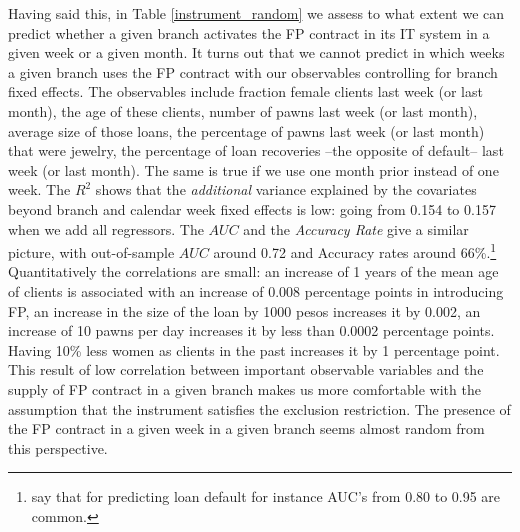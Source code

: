 \documentclass[oneside,11pt]{article}
\begin{document}
Having said this, in Table \ref{instrument_random} we assess to what extent we can predict whether a given branch activates the FP contract in its IT system in a given week or a given month. It turns out that we cannot predict in which weeks a given branch uses the FP contract with our observables controlling for branch fixed effects. The observables include fraction female clients last week (or last month), the age of these clients, number of pawns last week (or last month), average size of those loans, the percentage of pawns last week (or last month) that were jewelry, the percentage of loan recoveries --the opposite of default-- last week (or last month). The same is true if we use one month prior instead of one week. The $R^2$ shows that the \textit{additional} variance explained by the covariates beyond branch and calendar week fixed effects is low: going from 0.154 to 0.157 when we add all regressors. The $AUC$ and the \textit{Accuracy Rate} give a similar picture, with out-of-sample $AUC$ around 0.72 and Accuracy rates around 66\%.\footnote{\cite{Finanzia} say that for predicting loan default for instance AUC's from 0.80 to 0.95 are common.} \\ %

Quantitatively the correlations are small: an increase of 1 years of the mean age of clients is associated with an increase of 0.008 percentage points in introducing FP, an increase in the size of the loan by 1000 pesos increases it by 0.002, an increase of 10 pawns per day increases it by less than 0.0002 percentage points. Having 10\% less women as clients in the past increases it by 1 percentage point. This result of low correlation between important observable variables and the supply of FP contract in a given branch makes us more comfortable with the assumption that the instrument satisfies the exclusion restriction. The presence of the FP contract in a given week in a given branch seems almost random from this perspective.
\end{document}
